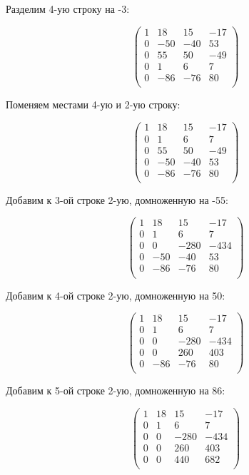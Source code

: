 	Разделим 4-ую строку на -3:
	
	\[
	\begin{pmatrix}
	1 & 18 & 15 & -17 \\
	0 & -50 & -40 & 53 \\
	0 & 55 & 50 & -49 \\
	0 & 1 & 6 & 7 \\
	0 & -86 & -76 & 80 \\
	\end{pmatrix}
	\]
	
	Поменяем местами 4-ую и 2-ую строку:
	
	\[
	\begin{pmatrix}
	1 & 18 & 15 & -17 \\
	0 & 1 & 6 & 7 \\
	0 & 55 & 50 & -49 \\
	0 & -50 & -40 & 53 \\
	0 & -86 & -76 & 80 \\
	\end{pmatrix}
	\]
	
	Добавим к 3-ой строке 2-ую, домноженную на -55:
	
	\[
	\begin{pmatrix}
	1 & 18 & 15 & -17 \\
	0 & 1 & 6 & 7 \\
	0 & 0 & -280 & -434 \\
	0 & -50 & -40 & 53 \\
	0 & -86 & -76 & 80 \\
	\end{pmatrix}
	\]
	
	Добавим к 4-ой строке 2-ую, домноженную на 50:
	
	\[
	\begin{pmatrix}
	1 & 18 & 15 & -17 \\
	0 & 1 & 6 & 7 \\
	0 & 0 & -280 & -434 \\
	0 & 0 & 260 & 403 \\
	0 & -86 & -76 & 80 \\
	\end{pmatrix}
	\]
	
	Добавим к 5-ой строке 2-ую, домноженную на 86:
	
	\[
	\begin{pmatrix}
	1 & 18 & 15 & -17 \\
	0 & 1 & 6 & 7 \\
	0 & 0 & -280 & -434 \\
	0 & 0 & 260 & 403 \\
	0 & 0 & 440 & 682 \\
	\end{pmatrix}
	\]
	
